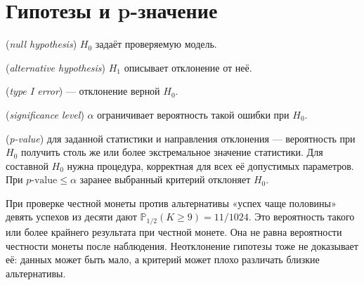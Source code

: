 \section{Гипотезы и p-значение}
\begin{definition} (\emph{null hypothesis}) \(H_0\) задаёт проверяемую модель. \par{} (\emph{alternative hypothesis}) \(H_1\) описывает отклонение от неё. \par{} (\emph{type I error}) — отклонение верной \(H_0\). \par{} (\emph{significance level}) \(\alpha\) ограничивает вероятность такой ошибки при \(H_0\).\end{definition}
\begin{definition} (\emph{p-value}) для заданной статистики и направления отклонения — вероятность при \(H_0\) получить столь же или более экстремальное значение статистики. Для составной \(H_0\) нужна процедура, корректная для всех её допустимых параметров. При \(p\text{-value}\le\alpha\) заранее выбранный критерий отклоняет \(H_0\).\end{definition}
При проверке честной монеты против альтернативы «успех чаще половины» девять успехов из десяти дают \(\mathbb P_{1/2}(K\ge9)=11/1024\). Это вероятность такого или более крайнего результата при честной монете. Она не равна вероятности честности монеты после наблюдения. Неотклонение гипотезы тоже не доказывает её: данных может быть мало, а критерий может плохо различать близкие альтернативы.

